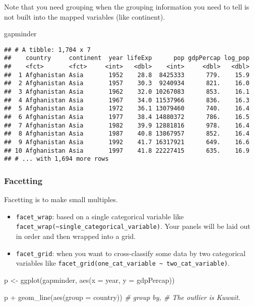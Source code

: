 \documentclass[
]{book}
\newenvironment{Shaded}{\begin{snugshade}}{\end{snugshade}}
\newcommand{\AttributeTok}[1]{\textcolor[rgb]{0.77,0.63,0.00}{#1}}
\newcommand{\CommentTok}[1]{\textcolor[rgb]{0.56,0.35,0.01}{\textit{#1}}}
\newcommand{\FunctionTok}[1]{\textcolor[rgb]{0.00,0.00,0.00}{#1}}
\newcommand{\NormalTok}[1]{#1}
\newcommand{\OtherTok}[1]{\textcolor[rgb]{0.56,0.35,0.01}{#1}}
\newcommand{\SpecialCharTok}[1]{\textcolor[rgb]{0.00,0.00,0.00}{#1}}
\begin{document}
Note that you need grouping when the grouping information you need to tell is not built into the mapped variables (like continent).

\begin{Shaded}
\begin{Highlighting}[]
\NormalTok{gapminder}
\end{Highlighting}
\end{Shaded}

\begin{verbatim}
## # A tibble: 1,704 x 7
##    country     continent  year lifeExp      pop gdpPercap log_pop
##    <fct>       <fct>     <int>   <dbl>    <int>     <dbl>   <dbl>
##  1 Afghanistan Asia       1952    28.8  8425333      779.    15.9
##  2 Afghanistan Asia       1957    30.3  9240934      821.    16.0
##  3 Afghanistan Asia       1962    32.0 10267083      853.    16.1
##  4 Afghanistan Asia       1967    34.0 11537966      836.    16.3
##  5 Afghanistan Asia       1972    36.1 13079460      740.    16.4
##  6 Afghanistan Asia       1977    38.4 14880372      786.    16.5
##  7 Afghanistan Asia       1982    39.9 12881816      978.    16.4
##  8 Afghanistan Asia       1987    40.8 13867957      852.    16.4
##  9 Afghanistan Asia       1992    41.7 16317921      649.    16.6
## 10 Afghanistan Asia       1997    41.8 22227415      635.    16.9
## # ... with 1,694 more rows
\end{verbatim}

\hypertarget{facetting}{%
\subsubsection{Facetting}\label{facetting}}

Facetting is to make small multiples.

\begin{itemize}
\item
  \texttt{facet\_wrap}: based on a single categorical variable like \texttt{facet\_wrap(\textasciitilde{}single\_categorical\_variable)}. Your panels will be laid out in order and then wrapped into a grid.
\item
  \texttt{facet\_grid}: when you want to cross-classify some data by two categorical variables like \texttt{facet\_grid(one\_cat\_variable\ \textasciitilde{}\ two\_cat\_variable)}.
\end{itemize}

\begin{Shaded}
\begin{Highlighting}[]
\NormalTok{p }\OtherTok{\textless{}{-}} \FunctionTok{ggplot}\NormalTok{(gapminder, }\FunctionTok{aes}\NormalTok{(}\AttributeTok{x =}\NormalTok{ year, }\AttributeTok{y =}\NormalTok{ gdpPercap))}

\NormalTok{p }\SpecialCharTok{+} \FunctionTok{geom\_line}\NormalTok{(}\FunctionTok{aes}\NormalTok{(}\AttributeTok{group =}\NormalTok{ country)) }\CommentTok{\# group by, \# The outlier is Kuwait.}
\end{Highlighting}
\end{Shaded}
\end{document}

